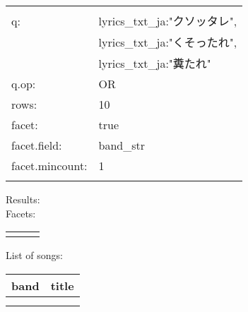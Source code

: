 \begin{tabular}{|l|l|}
	\hline
	& \\
	q: & lyrics\_txt\_ja:"クソッタレ", \\
	   & lyrics\_txt\_ja:"くそったれ", \\
	   & lyrics\_txt\_ja:"糞たれ"     \\
	q.op: & OR \\
	rows: & 10 \\
	facet: & true \\
	facet.field: & band\_str \\
	facet.mincount: & 1 \\
	& \\
	\hline
\end{tabular}


\bigskip
Results: \\



Facets:
\begin{longtable}{|l l|r|}
	\hline
	& & \\
	\endhead
	
	\hline
	\endfoot
	
	
	& & \\
\end{longtable}


List of songs:


\begin{longtable}{|l l|l|}
	\hline
	\multicolumn{2}{|c|}{band} & 
	\multicolumn{1}{|c|}{title}
	\\
	\hline
	& & \\
	\endhead
	
	
	& & \\
	\hline
\end{longtable}


%
%	
%	
%	
%	




